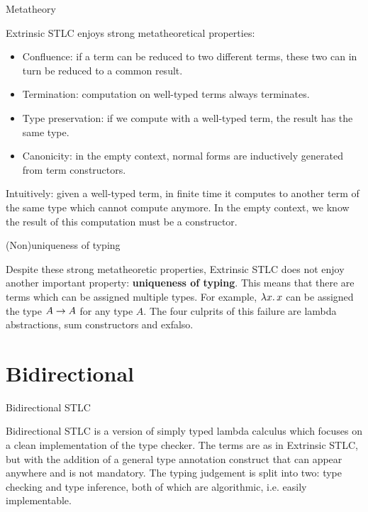 \documentclass{beamer}
\begin{document}
\begin{frame}{Metatheory}

Extrinsic STLC enjoys strong metatheoretical properties:

\begin{itemize}
  \item Confluence: if a term can be reduced to two different terms, these two can in turn be reduced to a common result.
  \item Termination: computation on well-typed terms always terminates.
  \item Type preservation: if we compute with a well-typed term, the result has the same type.
  \item Canonicity: in the empty context, normal forms are inductively generated from term constructors.
\end{itemize}

\vspace{1em}

Intuitively: given a well-typed term, in finite time it computes to another term of the same type which cannot compute anymore. In the empty context, we know the result of this computation must be a constructor.

\end{frame}

\begin{frame}{(Non)uniqueness of typing}

Despite these strong metatheoretic properties, Extrinsic STLC does not enjoy another important property: \textbf{uniqueness of typing}. This means that there are terms which can be assigned multiple types. For example, $\fun{x}{x}$ can be assigned the type $A \to A$ for any type $A$. The four culprits of this failure are lambda abstractions, sum constructors and exfalso.

\end{frame}

\section{Bidirectional}

\begin{frame}{Bidirectional STLC}

Bidirectional STLC is a version of simply typed lambda calculus which focuses on a clean implementation of the type checker. The terms are as in Extrinsic STLC, but with the addition of a general type annotation construct that can appear anywhere and is not mandatory. The typing judgement is split into two: type checking and type inference, both of which are algorithmic, i.e. easily implementable.

\end{frame}
\end{document}

